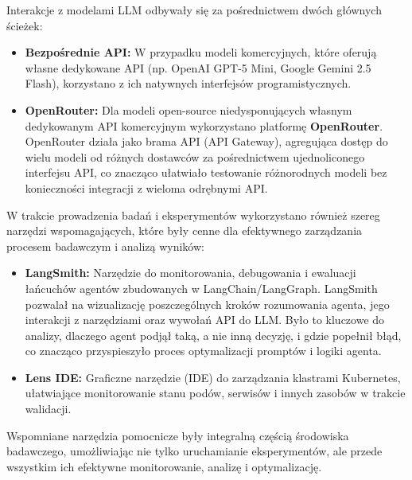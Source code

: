 Interakcje z modelami LLM odbywały się za pośrednictwem dwóch głównych ścieżek:
\begin{itemize}
    \item \textbf{Bezpośrednie API:} W przypadku modeli komercyjnych, które oferują własne dedykowane API (np. OpenAI GPT-5 Mini, Google Gemini 2.5 Flash), korzystano z ich natywnych interfejsów programistycznych.
    \item \textbf{OpenRouter:} Dla modeli open-source niedysponujących własnym dedykowanym API komercyjnym wykorzystano platformę \textbf{OpenRouter}. OpenRouter działa jako brama API (API Gateway), agregująca dostęp do wielu modeli od różnych dostawców za pośrednictwem ujednoliconego interfejsu API, co znacząco ułatwiało testowanie różnorodnych modeli bez konieczności integracji z wieloma odrębnymi API.
\end{itemize}

W trakcie prowadzenia badań i eksperymentów wykorzystano również szereg narzędzi wspomagających, które były cenne dla efektywnego zarządzania procesem badawczym i analizą wyników:
\begin{itemize}
	\item \textbf{LangSmith:} \cite{langsmith} Narzędzie do monitorowania, debugowania i ewaluacji łańcuchów agentów zbudowanych w LangChain/LangGraph. LangSmith pozwalał na wizualizację poszczególnych kroków rozumowania agenta, jego interakcji z narzędziami oraz wywołań API do LLM. Było to kluczowe do analizy, dlaczego agent podjął taką, a nie inną decyzję, i gdzie popełnił błąd, co znacząco przyspieszyło proces optymalizacji promptów i logiki agenta.
	\item \textbf{Lens IDE:} \cite{lens_ide} Graficzne narzędzie (IDE) do zarządzania klastrami Kubernetes, ułatwiające monitorowanie stanu podów, serwisów i innych zasobów w trakcie walidacji.
\end{itemize}
Wspomniane narzędzia pomocnicze były integralną częścią środowiska badawczego, umożliwiając nie tylko uruchamianie eksperymentów, ale przede wszystkim ich efektywne monitorowanie, analizę i optymalizację.
